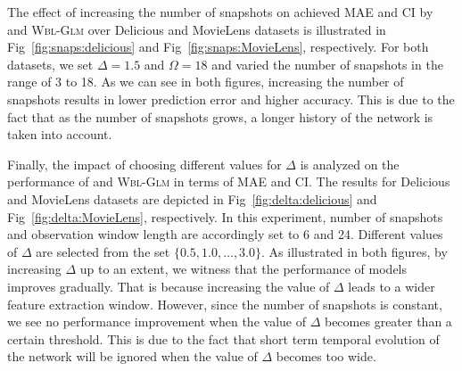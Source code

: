 The effect of increasing the number of snapshots on achieved MAE and CI by \npglm and \textsc{Wbl-Glm} over Delicious and MovieLens datasets is illustrated in Fig~\ref{fig:snaps:delicious} and Fig~\ref{fig:snaps:MovieLens}, respectively. For both datasets, we set $\Delta=1.5$ and $\Omega=18$ and varied the number of snapshots in the range of 3 to 18. As we can see in both figures, increasing the number of snapshots results in lower prediction error and higher accuracy. This is due to the fact that as the number of snapshots grows, a longer history of the network is taken into account. 

Finally, the impact of choosing different values for $\Delta$ is analyzed on the performance of \npglm and \textsc{Wbl-Glm} in terms of MAE and CI. The results for Delicious and MovieLens datasets are depicted in Fig~\ref{fig:delta:delicious} and Fig~\ref{fig:delta:MovieLens}, respectively. In this experiment, number of snapshots and observation window length are accordingly set to 6 and 24. Different values of $\Delta$ are selected from the set $\{0.5,1.0,\dots,3.0\}$. As illustrated in both figures, by increasing  $\Delta$ up to an extent, we witness that the performance of models improves gradually. That is because increasing the value of $\Delta$ leads to a wider feature extraction window. However, since the number of snapshots is constant, we see no performance improvement when the value of $\Delta$ becomes greater than a certain threshold. This is due to the fact that short term temporal evolution of the network will be ignored when the value of $\Delta$ becomes too wide.
 



